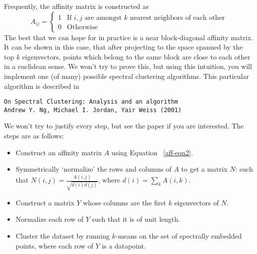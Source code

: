 \documentclass[11pt]{article}
\begin{document}
\begin{enumerate}
Frequently, the affinity matrix is constructed as
\begin{equation}
\label{aff-eqn2}
A_{ij} =\begin{cases}
1 & \mbox{If $i,j$ are amongst $k$ nearest neighbors of each other}\\
0 & \mbox{Otherwise}
\end{cases} 
\end{equation}
The best that we can hope for in practice is a
near block-diagonal affinity matrix.  It can be shown
in this case, that after projecting to the space spanned by the top $k$
eigenvectors, points which belong to the same block
are close to each other in a euclidean sense.  We won't try to prove this, but
using this intuition, you will implement one (of many) possible
spectral clustering algorithms.  This particular algorithm is described in
\begin{verbatim}
On Spectral Clustering: Analysis and an algorithm
Andrew Y. Ng, Michael I. Jordan, Yair Weiss (2001)
\end{verbatim}
We won't try to justify every step, but see the paper if you are interested.
The steps are as follows:
\begin{itemize}
\item Construct an affinity matrix $A$ using Equation ~\ref{aff-eqn2}. 
\item Symmetrically `normalize' the rows and columns of $A$ to get a matrix $N$:
such that $N(i,j)=\frac{A(i,j)}{\sqrt{d(i)d(j)}}$, where $d(i)=\sum_k A(i,k)$.
\item Construct a matrix $Y$ whose columns are the first $k$ eigenvectors of $N$.
\item Normalize each row of $Y$ such that it is of unit length.
\item Cluster the dataset by running $k$-means on the set of spectrally embedded points, where each row of $Y$ is a datapoint.

\end{itemize}



\end{enumerate}
\end{document}
